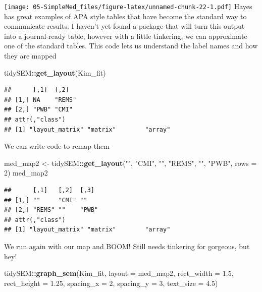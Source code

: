 \documentclass[
  11pt,
]{book}
\newenvironment{Shaded}{\begin{snugshade}}{\end{snugshade}}
\newcommand{\AttributeTok}[1]{\textcolor[rgb]{0.27,0.27,0.27}{#1}}
\newcommand{\DecValTok}[1]{\textcolor[rgb]{0.06,0.06,0.06}{#1}}
\newcommand{\FloatTok}[1]{\textcolor[rgb]{0.06,0.06,0.06}{#1}}
\newcommand{\FunctionTok}[1]{\textcolor[rgb]{0.27,0.27,0.27}{\textbf{#1}}}
\newcommand{\NormalTok}[1]{#1}
\newcommand{\OtherTok}[1]{\textcolor[rgb]{0.37,0.37,0.37}{#1}}
\newcommand{\SpecialCharTok}[1]{\textcolor[rgb]{0.43,0.43,0.43}{\textbf{#1}}}
\newcommand{\StringTok}[1]{\textcolor[rgb]{0.5,0.5,0.5}{#1}}
\begin{document}
\texttt{[image: 05-SimpleMed\_files/figure-latex/unnamed-chunk-22-1.pdf]} Hayes has great examples of APA style tables that have become the standard way to communicate results. I haven't yet found a package that will turn this output into a journal-ready table, however with a little tinkering, we can approximate one of the standard tables. This code lets us understand the label names and how they are mapped

\begin{Shaded}
\begin{Highlighting}[]
\NormalTok{tidySEM}\SpecialCharTok{::}\FunctionTok{get\_layout}\NormalTok{(Kim\_fit)}
\end{Highlighting}
\end{Shaded}

\begin{verbatim}
##      [,1]  [,2]  
## [1,] NA    "REMS"
## [2,] "PWB" "CMI" 
## attr(,"class")
## [1] "layout_matrix" "matrix"        "array"
\end{verbatim}

We can write code to remap them

\begin{Shaded}
\begin{Highlighting}[]
\NormalTok{med\_map2 }\OtherTok{\textless{}{-}}\NormalTok{ tidySEM}\SpecialCharTok{::}\FunctionTok{get\_layout}\NormalTok{(}\StringTok{""}\NormalTok{, }\StringTok{"CMI"}\NormalTok{, }\StringTok{""}\NormalTok{, }\StringTok{"REMS"}\NormalTok{, }\StringTok{""}\NormalTok{, }\StringTok{"PWB"}\NormalTok{, }\AttributeTok{rows =} \DecValTok{2}\NormalTok{)}
\NormalTok{med\_map2}
\end{Highlighting}
\end{Shaded}

\begin{verbatim}
##      [,1]   [,2]  [,3] 
## [1,] ""     "CMI" ""   
## [2,] "REMS" ""    "PWB"
## attr(,"class")
## [1] "layout_matrix" "matrix"        "array"
\end{verbatim}

We run again with our map and BOOM! Still needs tinkering for gorgeous, but hey!

\begin{Shaded}
\begin{Highlighting}[]
\NormalTok{tidySEM}\SpecialCharTok{::}\FunctionTok{graph\_sem}\NormalTok{(Kim\_fit, }\AttributeTok{layout =}\NormalTok{ med\_map2, }\AttributeTok{rect\_width =} \FloatTok{1.5}\NormalTok{, }\AttributeTok{rect\_height =} \FloatTok{1.25}\NormalTok{,}
    \AttributeTok{spacing\_x =} \DecValTok{2}\NormalTok{, }\AttributeTok{spacing\_y =} \DecValTok{3}\NormalTok{, }\AttributeTok{text\_size =} \FloatTok{4.5}\NormalTok{)}
\end{Highlighting}
\end{Shaded}
\end{document}

